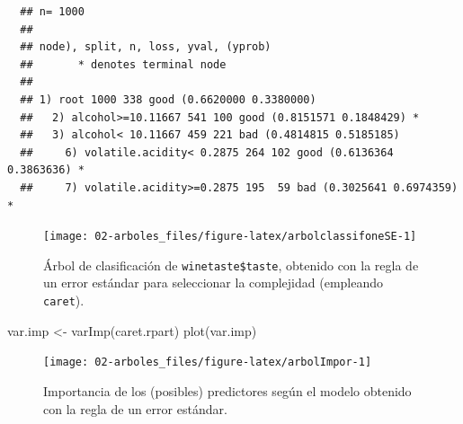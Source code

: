 \documentclass[
]{book}
\newenvironment{Shaded}{\begin{snugshade}}{\end{snugshade}}
\newcommand{\CommentTok}[1]{\textcolor[rgb]{0.56,0.35,0.01}{\textit{#1}}}
\newcommand{\FunctionTok}[1]{\textcolor[rgb]{0.00,0.00,0.00}{#1}}
\newcommand{\NormalTok}[1]{#1}
\newcommand{\OtherTok}[1]{\textcolor[rgb]{0.56,0.35,0.01}{#1}}
\newcommand{\SpecialCharTok}[1]{\textcolor[rgb]{0.00,0.00,0.00}{#1}}
\theoremstyle{break}
\theoremstyle{nonumberplain}
\renewcommand{\CommentTok}[1]{\textcolor[rgb]{0.41,0.41,0.41}{\texttt{#1}}}
\begin{document}
\begin{Shaded}
\end{Shaded}

\begin{verbatim}
  ## n= 1000 
  ## 
  ## node), split, n, loss, yval, (yprob)
  ##       * denotes terminal node
  ## 
  ## 1) root 1000 338 good (0.6620000 0.3380000)  
  ##   2) alcohol>=10.11667 541 100 good (0.8151571 0.1848429) *
  ##   3) alcohol< 10.11667 459 221 bad (0.4814815 0.5185185)  
  ##     6) volatile.acidity< 0.2875 264 102 good (0.6136364 0.3863636) *
  ##     7) volatile.acidity>=0.2875 195  59 bad (0.3025641 0.6974359) *
\end{verbatim}

\begin{Shaded}
\end{Shaded}

\begin{figure}[!htb]

{\centering \texttt{[image: 02-arboles\_files/figure-latex/arbolclassifoneSE-1]} 

}

\caption{Árbol de clasificación de \texttt{winetaste\$taste}, obtenido con la regla de un error estándar para seleccionar la complejidad (empleando \texttt{caret}).}\label{fig:arbolclassifoneSE}
\end{figure}

\begin{Shaded}
\begin{Highlighting}[]
\NormalTok{var.imp }\OtherTok{\textless{}{-}} \FunctionTok{varImp}\NormalTok{(caret.rpart)}
\FunctionTok{plot}\NormalTok{(var.imp)}
\end{Highlighting}
\end{Shaded}

\begin{figure}[!htb]

{\centering \texttt{[image: 02-arboles\_files/figure-latex/arbolImpor-1]} 

}

\caption{Importancia de los (posibles) predictores según el modelo obtenido con la regla de un error estándar.}\label{fig:arbolImpor}
\end{figure}
\end{document}

